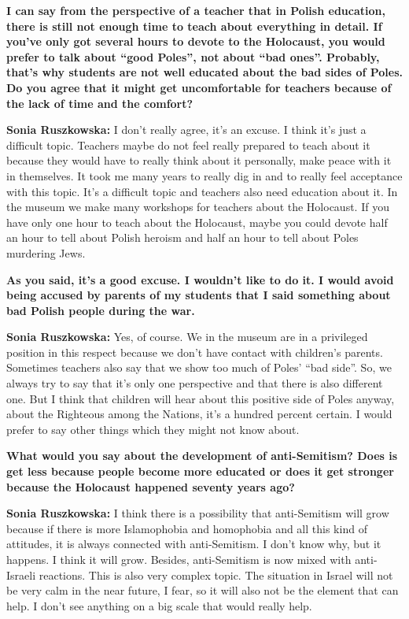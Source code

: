 \textbf{I can say from the perspective of a teacher that in Polish education, there is still not enough time to teach about everything in detail. If you've only got several hours to devote to the Holocaust, you would prefer to talk about ``good Poles'', not about ``bad ones''. Probably, that’s why students are not well educated about the bad sides of Poles. Do you agree that it might get uncomfortable for teachers because of the lack of time and the comfort?} 

\textbf{Sonia Ruszkowska:} I don’t really agree, it’s an excuse. I think it’s just a difficult topic. Teachers maybe do not feel really prepared to teach about it because they would have to really think about it personally, make peace with it in themselves. It took me many years to really dig in and to really feel acceptance with this topic. It’s a difficult topic and teachers also need education about it. In the museum we make many workshops for teachers about the Holocaust. If you have only one hour to teach about the Holocaust, maybe you could devote half an hour to tell about Polish heroism and half an hour to tell about Poles murdering Jews. 

\textbf{As you said, it’s a good excuse. I wouldn’t like to do it. I would avoid being accused by parents of my students that I said something about bad Polish people during the war.} 

\textbf{Sonia Ruszkowska:} Yes, of course. We in the museum are in a privileged position in this respect because we don’t have contact with children’s parents. Sometimes teachers also say that we show too much of Poles’ ``bad side''. So, we always try to say that it’s only one perspective and that there is also different one. But I think that children will hear about this positive side of Poles anyway, about the Righteous among the Nations, it’s a hundred percent certain. I would prefer to say other things which they might not know about. 

\textbf{What would you say about the development of anti-Semitism? Does is get less because people become more educated or does it get stronger because the Holocaust happened seventy years ago?} 

\textbf{Sonia Ruszkowska:} I think there is a possibility that anti-Semitism will grow because if there is more Islamophobia and homophobia and all this kind of attitudes, it is always connected with anti-Semitism. I don’t know why, but it happens. I think it will grow. Besides, anti-Semitism is now mixed with anti-Israeli reactions. This is also very complex topic. The situation in Israel will not be very calm in the near future, I fear, so it will also not be the element that can help. I don’t see anything on a big scale that would really help. 
 
